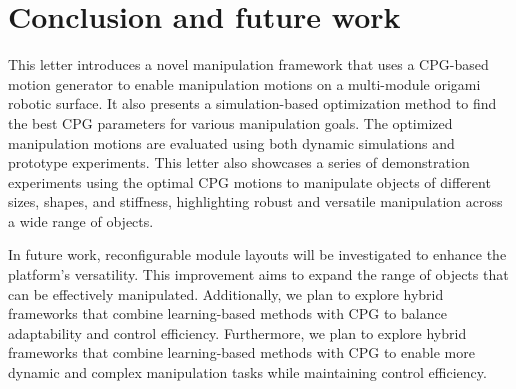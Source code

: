 \section{Conclusion and future work}
\label{sec:conclusion}

This letter introduces a novel manipulation framework that uses a CPG-based motion generator to enable manipulation motions on a multi-module origami robotic surface. It also presents a simulation-based optimization method to find the best CPG parameters for various manipulation goals. The optimized manipulation motions are evaluated using both dynamic simulations and prototype experiments. This letter also showcases a series of demonstration experiments using the optimal CPG motions to manipulate objects of different sizes, shapes, and stiffness, highlighting robust and versatile manipulation across a wide range of objects.

In future work, reconfigurable module layouts will be investigated to enhance the platform's versatility. This improvement aims to expand the range of objects that can be effectively manipulated. Additionally, we plan to explore hybrid frameworks that combine learning-based methods with CPG to balance adaptability and control efficiency. Furthermore, we plan to explore hybrid frameworks that combine learning-based methods with CPG to enable more dynamic and complex manipulation tasks while maintaining control efficiency.

